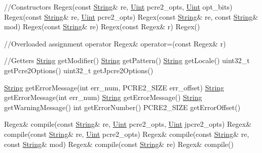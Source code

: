 \begin{DoxyCode}

\textcolor{comment}{//Constructors}
Regex(\textcolor{keyword}{const} \hyperlink{namespacejpcre2_a91f03070152fb228bc116c5a737f1d16}{String}& re, \hyperlink{namespacejpcre2_a078242d38221a13fb3543b9edd78c099}{Uint} pcre2\_opts, \hyperlink{namespacejpcre2_a078242d38221a13fb3543b9edd78c099}{Uint} opt\_bits)
Regex(\textcolor{keyword}{const} \hyperlink{namespacejpcre2_a91f03070152fb228bc116c5a737f1d16}{String}& re, \hyperlink{namespacejpcre2_a078242d38221a13fb3543b9edd78c099}{Uint} pcre2\_opts)
Regex(\textcolor{keyword}{const} \hyperlink{namespacejpcre2_a91f03070152fb228bc116c5a737f1d16}{String}& re, \textcolor{keyword}{const} \hyperlink{namespacejpcre2_a91f03070152fb228bc116c5a737f1d16}{String}& mod)
Regex(\textcolor{keyword}{const} \hyperlink{namespacejpcre2_a91f03070152fb228bc116c5a737f1d16}{String}& re)
Regex(\textcolor{keyword}{const} Regex& r)
Regex()

\textcolor{comment}{//Overloaded assignment operator}
Regex&              operator=(const Regex& r)

\textcolor{comment}{//Getters}
\hyperlink{namespacejpcre2_a91f03070152fb228bc116c5a737f1d16}{String}              getModifier()
\hyperlink{namespacejpcre2_a91f03070152fb228bc116c5a737f1d16}{String}              getPattern()
\hyperlink{namespacejpcre2_a91f03070152fb228bc116c5a737f1d16}{String}              getLocale()       
uint32\_t            getPcre2Options()
uint32\_t            getJpcre2Options()

\hyperlink{namespacejpcre2_a91f03070152fb228bc116c5a737f1d16}{String}              getErrorMessage(\textcolor{keywordtype}{int} err\_num, PCRE2\_SIZE err\_offset)
\hyperlink{namespacejpcre2_a91f03070152fb228bc116c5a737f1d16}{String}              getErrorMessage(\textcolor{keywordtype}{int} err\_num)
\hyperlink{namespacejpcre2_a91f03070152fb228bc116c5a737f1d16}{String}              getErrorMessage()
\hyperlink{namespacejpcre2_a91f03070152fb228bc116c5a737f1d16}{String}              getWarningMessage()
\textcolor{keywordtype}{int}                 getErrorNumber()
PCRE2\_SIZE          getErrorOffset()

Regex&              compile(const \hyperlink{namespacejpcre2_a91f03070152fb228bc116c5a737f1d16}{String}& re, \hyperlink{namespacejpcre2_a078242d38221a13fb3543b9edd78c099}{Uint} pcre2\_opts, \hyperlink{namespacejpcre2_a078242d38221a13fb3543b9edd78c099}{Uint} jpcre2\_opts)
Regex&              compile(const \hyperlink{namespacejpcre2_a91f03070152fb228bc116c5a737f1d16}{String}& re, \hyperlink{namespacejpcre2_a078242d38221a13fb3543b9edd78c099}{Uint} pcre2\_opts)
Regex&              compile(const \hyperlink{namespacejpcre2_a91f03070152fb228bc116c5a737f1d16}{String}& re, const \hyperlink{namespacejpcre2_a91f03070152fb228bc116c5a737f1d16}{String}& mod)
Regex&              compile(const \hyperlink{namespacejpcre2_a91f03070152fb228bc116c5a737f1d16}{String}& re)
Regex&              compile()


\end{DoxyCode}
